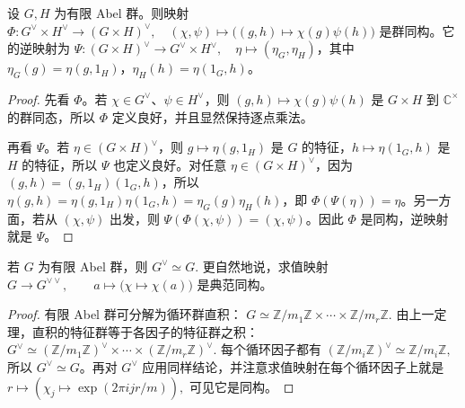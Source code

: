 \documentclass[oneside]{AJbook}
\newcommand{\Z}{\mathbb Z}
\newcommand{\C}{\mathbb C}
\newcommand{\Cyc}[1]{\Z/#1\Z}
\newcommand{\expi}[1]{\exp(2\pi i #1)}
\begin{document}
\begin{theorem}[直积的对偶群]
设 $G,H$ 为有限 Abel 群。则映射
\(\Phi:G^\vee\times H^\vee\longrightarrow (G\times H)^\vee,\quad
(\chi,\psi)\longmapsto\bigl((g,h)\mapsto \chi(g)\psi(h)\bigr)\)
是群同构。它的逆映射为
\(\Psi:(G\times H)^\vee\longrightarrow G^\vee\times H^\vee,\quad
\eta\longmapsto(\eta_G,\eta_H)\)，其中
\(\eta_G(g)=\eta(g,1_H)\)，\(\eta_H(h)=\eta(1_G,h)\)。
\end{theorem}

\begin{proof}
先看 \(\Phi\)。若 \(\chi\in G^\vee\)、\(\psi\in H^\vee\)，则 \((g,h)\mapsto \chi(g)\psi(h)\) 是 \(G\times H\) 到 \(\C^\times\) 的群同态，所以 \(\Phi\) 定义良好，并且显然保持逐点乘法。

再看 \(\Psi\)。若 \(\eta\in (G\times H)^\vee\)，则 \(g\mapsto\eta(g,1_H)\) 是 \(G\) 的特征，\(h\mapsto\eta(1_G,h)\) 是 \(H\) 的特征，所以 \(\Psi\) 也定义良好。对任意 \(\eta\in (G\times H)^\vee\)，因为 \((g,h)=(g,1_H)(1_G,h)\)，所以 \(\eta(g,h)=\eta(g,1_H)\eta(1_G,h)=\eta_G(g)\eta_H(h)\)，即 \(\Phi(\Psi(\eta))=\eta\)。另一方面，若从 \((\chi,\psi)\) 出发，则 \(\Psi(\Phi(\chi,\psi))=(\chi,\psi)\)。因此 \(\Phi\) 是同构，逆映射就是 \(\Psi\)。
\end{proof}

\begin{theorem}
若 $G$ 为有限 Abel 群，则
\(
  G^\vee\simeq G.
\)
更自然地说，求值映射
\(
  G\longrightarrow G^{\vee\vee},\qquad
  a\longmapsto\bigl(\chi\mapsto \chi(a)\bigr)
\)
是典范同构。
\end{theorem}

\begin{proof}
有限 Abel 群可分解为循环群直积：
\(
  G\simeq \Cyc{m_1}\times\cdots\times \Cyc{m_r}.
\)
由上一定理，直积的特征群等于各因子的特征群之积：
\(
  G^\vee\simeq
  (\Cyc{m_1})^\vee\times\cdots\times(\Cyc{m_r})^\vee.
\)
每个循环因子都有
\(
  (\Cyc{m_i})^\vee\simeq \Cyc{m_i},
\)
所以 $G^\vee\simeq G$。再对 $G^\vee$ 应用同样结论，并注意求值映射在每个循环因子上就是
\(
  r\longmapsto(\chi_j\mapsto \expi{jr/m}),
\)
可见它是同构。
\end{proof}
\end{document}
